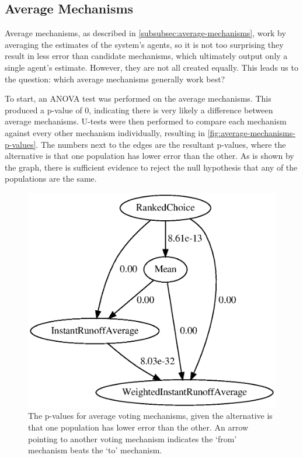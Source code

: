 \subsection{Average Mechanisms}\label{subsec:lowest-error-average-mechanisms}
Average mechanisms, as described in \autoref{subsubsec:average-mechanisms}, work by
averaging the estimates of the system's agents, so it is not too surprising they
result in less error than candidate mechanisms, which ultimately output only a single
agent's estimate.
However, they are not all created equally.
This leads us to the question: which average mechanisms generally work best?

To start, an ANOVA test was performed on the average mechanisms.
This produced a p-value of 0, indicating there is very likely a difference between
average mechanisms.
U-tests were then performed to compare each mechanism against every other
mechanism individually, resulting in \autoref{fig:average-mechanisms-p-values}.
The numbers next to the edges are the resultant p-values, where the alternative is
that one population has lower error than the other.
As is shown by the graph, there is sufficient evidence to reject the null hypothesis
that any of the populations are the same.

\begin{figure}[htbp]
    \centering
    \includegraphics[scale=0.75]
    {./content/figures/voting_mechanisms/average-mechanisms-p-values.gv}
    \caption{The p-values for average voting mechanisms, given the alternative is
    that one population has lower error than the other.
    An arrow pointing to another voting mechanism indicates the `from' mechanism
    beats the `to' mechanism.}
    \label{fig:average-mechanisms-p-values}
\end{figure}

